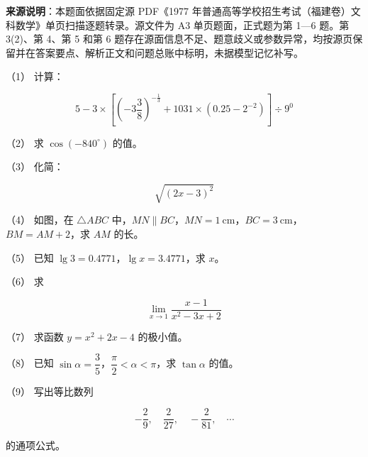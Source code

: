 


\begin{gktip}
\textbf{来源说明}：本题面依据固定源 PDF《1977 年普通高等学校招生考试（福建卷）文科数学》单页扫描逐题转录。源文件为 A3 单页题面，正式题为第 1—6 题。第 3(2)、第 4、第 5 和第 6 题存在源面信息不足、题意歧义或参数异常，均按源页保留并在答案要点、解析正文和问题总账中标明，未据模型记忆补写。
\end{gktip}

\Needspace{0.4\textheight}
\begin{question}

（1） 计算：

\nopagebreak[4]
\[
5-3\times\left[\left(-3\frac38\right)^{-\frac13}+1031\times\left(0.25-2^{-2}\right)\right]\div9^0
\]

（2） 求 $\cos(-840^\circ)$ 的值。

（3） 化简：

\nopagebreak[4]
\[
\sqrt{(2x-3)^2}
\]

（4） 如图，在 $\triangle ABC$ 中，$MN\parallel BC$，$MN=1\ \mathrm{cm}$，$BC=3\ \mathrm{cm}$，$BM=AM+2$，求 $AM$ 的长。
\nopagebreak[4]
\begin{center}\end{center}
\nopagebreak[4]
（5） 已知 $\lg3=0.4771$，$\lg x=3.4771$，求 $x$。

（6） 求

\nopagebreak[4]
\[
\lim_{x\to1}\frac{x-1}{x^2-3x+2}
\]

（7） 求函数 $y=x^2+2x-4$ 的极小值。

（8） 已知 $\sin\alpha=\dfrac35$，$\dfrac\pi2<\alpha<\pi$，求 $\tan\alpha$ 的值。

（9） 写出等比数列

\nopagebreak[4]
\[
-\frac29,\quad \frac2{27},\quad -\frac2{81},\quad\cdots
\]

的通项公式。

\end{question}
